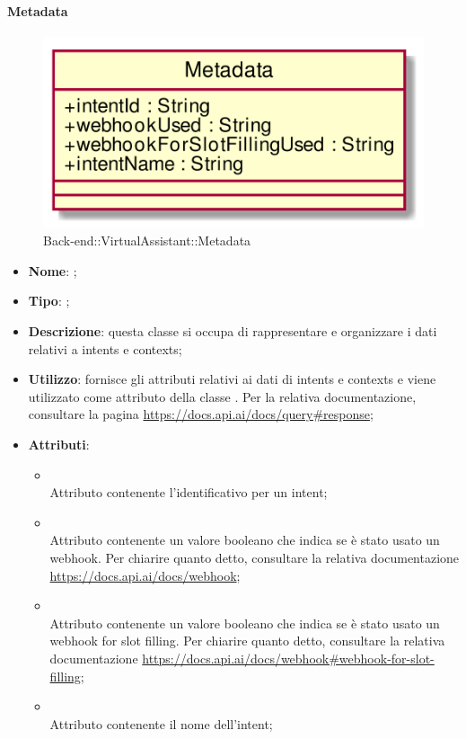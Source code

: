 \hypertarget{Metadata_label}{\paragraph{Metadata}}
\begin{figure}[h]
	\centering
	\includegraphics[width=\textwidth,height=\textheight,keepaspectratio]{images/ClassMetadata.png}
	\caption{Back-end::VirtualAssistant::Metadata}
\end{figure}
\begin{itemize}
	\item \textbf{Nome}: ;
	\item \textbf{Tipo}: ;
	\item \textbf{Descrizione}: questa classe si occupa di rappresentare e organizzare i dati relativi a intents e contexts;
	\item \textbf{Utilizzo}: fornisce gli attributi relativi ai dati di intents e contexts e viene utilizzato come attributo della classe .
Per la relativa documentazione, consultare la pagina \url{https://docs.api.ai/docs/query#response};
	\item \textbf{Attributi}:
	\begin{itemize}
		\item[]  \\
		Attributo contenente l'identificativo per un intent;
		\item[]  \\
		Attributo contenente un valore booleano che indica se è stato usato un webhook. Per chiarire quanto detto, consultare la relativa documentazione \url{https://docs.api.ai/docs/webhook};
		\item[]  \\
		Attributo contenente un valore booleano che indica se è stato usato un webhook for slot filling.
Per chiarire quanto detto, consultare la relativa documentazione \url{https://docs.api.ai/docs/webhook#webhook-for-slot-filling};
		\item[]  \\
		Attributo contenente il nome dell'intent;
	\end{itemize}
\end{itemize}
\FloatBarrier

